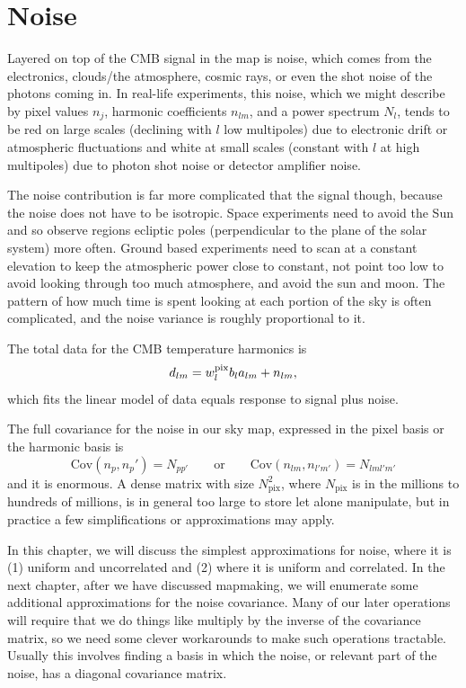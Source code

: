 \section{Noise}

Layered on top of the CMB signal in the map is noise, which comes from the electronics, clouds/the atmosphere, cosmic rays, or even the shot noise of the photons coming in.  In real-life experiments, this noise, which we might describe by pixel values $n_j$, harmonic coefficients $n_{lm}$, and a power spectrum $N_l$, tends to be red on large scales (declining with $l$ low multipoles) due to electronic drift or atmospheric fluctuations and white at small scales (constant with $l$ at high multipoles) due to photon shot noise or detector amplifier noise.

The noise contribution is far more complicated that the signal though, because the noise does not have to be isotropic.  Space experiments need to avoid the Sun and so observe regions ecliptic poles (perpendicular to the plane of the solar system) more often.  Ground based experiments need to scan at a constant elevation to keep the atmospheric power close to constant, not point too low to avoid looking through too much atmosphere, and avoid the sun and moon.  The pattern of how much time is spent looking at each portion of the sky is often complicated, and the noise variance is roughly proportional to it.

The total data for the CMB temperature harmonics is
\begin{equation}
  d_{lm} = w^{\rm pix}_l b_l a_{lm} + n_{lm}, \label{eq:data_harmonics}
\end{equation}
which fits the linear model of data equals response to signal plus noise.

The full covariance for the noise in our sky map, expressed in the pixel basis or the harmonic basis is
\begin{equation}
  \textrm{Cov}(n_p,n_p') = N_{pp'} \qquad \mbox{or} \qquad \textrm{Cov}(n_{lm},n_{l'm'}) = N_{lml'm'}
\end{equation}
and it is enormous.  A dense matrix with size $N_\textrm{pix}^2$, where $N_\textrm{pix}$ is in the millions to hundreds of millions, is in general too large to store let alone manipulate, but in practice a few simplifications or approximations may apply.


In this chapter, we will discuss the simplest approximations for noise, where it is (1) uniform and uncorrelated and (2) where it is uniform and correlated.  In the next chapter, after we have discussed mapmaking, we will enumerate some additional approximations for the noise covariance.   Many of our later operations will require that we do things like multiply by the inverse of the covariance matrix, so we need some clever workarounds to make such operations tractable.  Usually this involves finding a basis in which the noise, or relevant part of the noise, has a diagonal covariance matrix.

